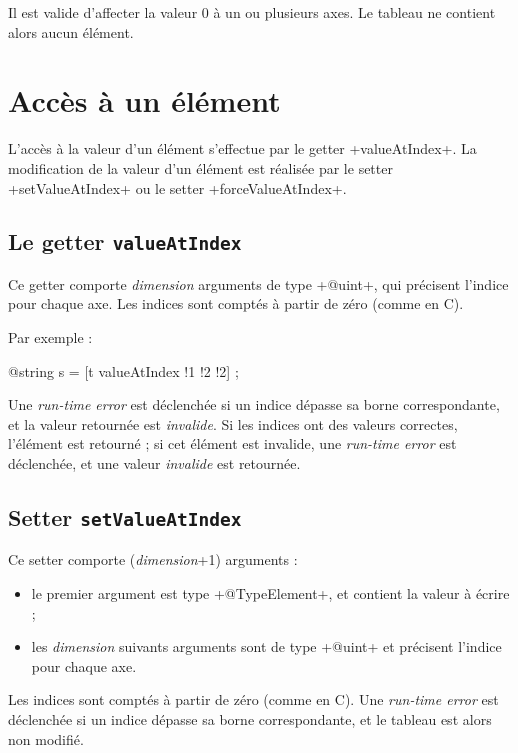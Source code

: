 Il est valide d'affecter la valeur $0$ à un ou plusieurs axes. Le tableau ne contient alors aucun élément.


\section{Accès à un élément}

L'accès à la valeur d'un élément s'effectue par le getter \ggst+valueAtIndex+. La modification de la valeur d'un élément est réalisée par le setter \ggst+setValueAtIndex+ ou le setter \ggst+forceValueAtIndex+.

\subsection{Le getter \texttt{valueAtIndex}}

Ce getter comporte \emph{dimension} arguments de type \ggst+@uint+, qui précisent l'indice pour chaque axe. Les indices sont comptés à partir de zéro (comme en C).

Par exemple :
\begin{galgas3}
  @string s = [t valueAtIndex !1 !2 !2] ;
\end{galgas3}


Une \emph{run-time error} est déclenchée si un indice dépasse sa borne correspondante, et la valeur retournée est \emph{invalide}. Si les indices ont des valeurs correctes, l'élément est retourné ; si cet élément est invalide, une \emph{run-time error} est déclenchée, et une valeur \emph{invalide} est retournée.






\subsection{Setter \texttt{setValueAtIndex}}

Ce setter comporte (\emph{dimension}+1) arguments :
\begin{itemize}
  \item le premier argument est type \ggst+@TypeElement+, et contient la valeur à écrire ;
  \item les \emph{dimension} suivants arguments sont de type \ggst+@uint+ et précisent l'indice pour chaque axe.
\end{itemize}

Les indices sont comptés à partir de zéro (comme en C). Une \emph{run-time error} est déclenchée si un indice dépasse sa borne correspondante, et le tableau est alors non modifié.

